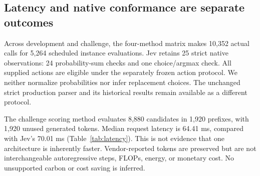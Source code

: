\begin{table}[t]
\centering\small

\caption{Episodes losing every globally optimal completion at the first
decision, over all forty feasible episodes. Later errors remain represented
in the full per-step regret artifact. This is a retrospective diagnostic,
not a new inference experiment.}
\label{tab:loss}
\end{table}

\subsection{Latency and native conformance are separate outcomes}
\begin{table}[t]
\centering\small

\caption{Observed client-path request latency on the challenge. Network,
rendering, cache and hosting differ; this is not an architecture-isolated
speed comparison. No compute-equivalence claim is made.}
\label{tab:latency}
\end{table}
Across development and challenge, the four-method matrix makes 10,352
actual calls for 5,264 scheduled instance evaluations. Jev retains 25 strict
native observations: 24 probability-sum checks and one choice/argmax check.
All supplied actions are eligible under the separately frozen action protocol.
We neither normalize probabilities nor infer replacement choices.
The unchanged strict production parser and its historical results remain
available as a different protocol.

The challenge scoring method evaluates 8,880 candidates in 1,920 prefixes,
with 1,920 unused generated tokens. Median request latency is 64.41 ms,
compared with Jev's 70.01 ms (Table~\ref{tab:latency}). This is not evidence
that one architecture is inherently faster. Vendor-reported tokens are
preserved but are not interchangeable autoregressive steps, FLOPs, energy,
or monetary cost. No unsupported carbon or cost saving is inferred.
